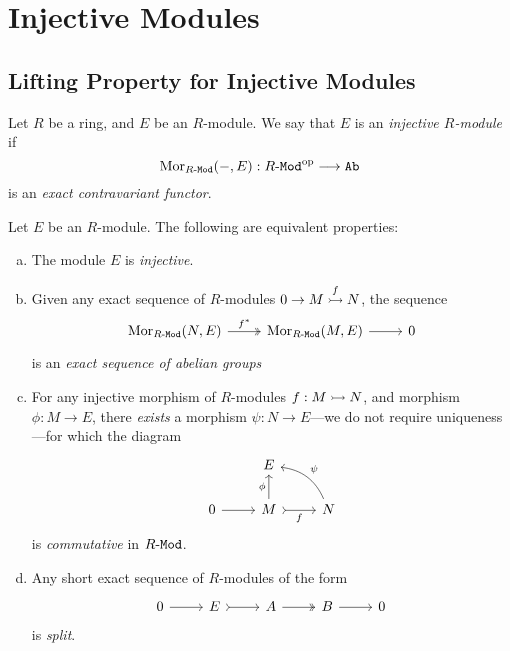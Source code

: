 \section{Injective Modules}

\subsection{Lifting Property for Injective Modules}

\begin{definition}
    \label{def:injective-modules}
    Let \(R\) be a ring, and \(E\) be an \(R\)-module. We say that \(E\) is an
    \emph{injective \(R\)-module} if
    \[
        \operatorname{Mor}_{{R\text{-}\texttt{Mod}}}(-, E): {R\text{-}\texttt{Mod}}^{\mathrm{op}} \longrightarrow {\texttt{Ab}}
    \]
    is an \emph{exact contravariant functor}.
\end{definition}

\begin{proposition}
    \label{prop:injective-modules-equivalences}
    Let \(E\) be an \(R\)-module. The following are equivalent properties:
    \begin{enumerate}[(a)]\setlength\itemsep{0em}
        \item The module \(E\) is \emph{injective}.

        \item Given any exact sequence of \(R\)-modules \(0 \to M \overset{f}{\rightarrowtail} N\),
              the sequence
              \[
                  \begin{tikzcd}
                      \Hom_{\Mod{R}}(N, E) \ar[r, two heads, "f^{*}"] &\Hom_{\Mod{R}}(M, E) \ar[r] &0
                  \end{tikzcd}
              \]
              is an \emph{exact sequence of abelian groups}

        \item For any injective morphism of \(R\)-modules \(f: M \rightarrowtail N\), and morphism
              \(\phi: M \to E\), there \emph{exists} a morphism \(\psi: N \to E\)---we do
              not require uniqueness---for which the diagram
              \[
                  \begin{tikzcd}
                      &E & \\
                      0 \ar[r] &M \ar[r, tail, "f"'] \ar[u, "\phi"] &N \ar[lu, bend right, "\psi"']
                  \end{tikzcd}
              \]
              is \emph{commutative} in \({R\text{-}\texttt{Mod}}\).

        \item Any
              short exact sequence of \(R\)-modules of the form
              \[
                  \begin{tikzcd}
                      0 \ar[r] &E \ar[r, tail] &A \ar[r, two heads] &B \ar[r] &0
                  \end{tikzcd}
              \]
              is \emph{split}.
    \end{enumerate}
\end{proposition}

